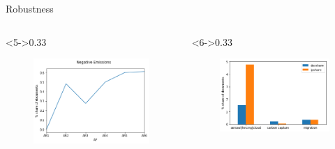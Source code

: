 \documentclass[9pt]{beamer}
\begin{document}
\begin{frame}{Robustness}
\begin{columns}
\end{columns}
\begin{columns}
	
	\begin{column}<5->{0.33\linewidth}
		\begin{figure}
			\includegraphics[width=\linewidth]{../plots/negative_emissions_share}
		\end{figure}
	\end{column}
	
	\begin{column}<6->{0.33\linewidth}
		\begin{figure}
			\includegraphics[width=\linewidth]{../plots/ipcc_rep_simple}
		\end{figure}
	\end{column}
\end{columns}

\end{frame}
\end{document}

